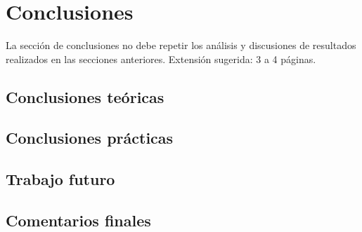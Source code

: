 \chapter{Conclusiones}
\label{ch:conclu}

La sección de conclusiones no debe repetir los análisis y discusiones de resultados realizados en las secciones anteriores. Extensión sugerida: 3 a 4 páginas.

\section{Conclusiones teóricas}
\section{Conclusiones prácticas}
\section{Trabajo futuro}
\section{Comentarios finales}
